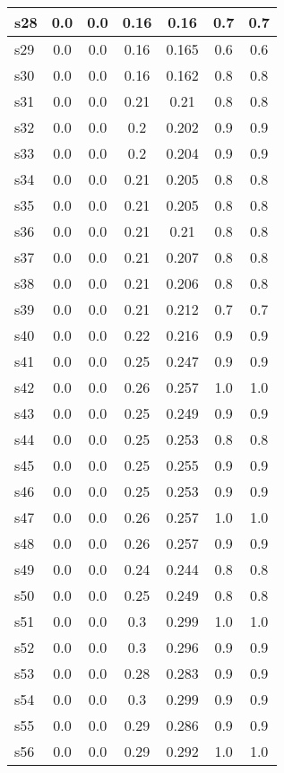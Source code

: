 \documentclass{article}
\begin{document}
\begin{tabular}{|l|c|c|c|c|c|c|}
\hline
s28 &0.0 & 0.0 & 0.16 & 0.16 & 0.7 & 0.7\\
\hline
s29 &0.0 & 0.0 & 0.16 & 0.165 & 0.6 & 0.6\\
\hline
s30 &0.0 & 0.0 & 0.16 & 0.162 & 0.8 & 0.8\\
\hline
s31 &0.0 & 0.0 & 0.21 & 0.21 & 0.8 & 0.8\\
\hline
s32 &0.0 & 0.0 & 0.2 & 0.202 & 0.9 & 0.9\\
\hline
s33 &0.0 & 0.0 & 0.2 & 0.204 & 0.9 & 0.9\\
\hline
s34 &0.0 & 0.0 & 0.21 & 0.205 & 0.8 & 0.8\\
\hline
s35 &0.0 & 0.0 & 0.21 & 0.205 & 0.8 & 0.8\\
\hline
s36 &0.0 & 0.0 & 0.21 & 0.21 & 0.8 & 0.8\\
\hline
s37 &0.0 & 0.0 & 0.21 & 0.207 & 0.8 & 0.8\\
\hline
s38 &0.0 & 0.0 & 0.21 & 0.206 & 0.8 & 0.8\\
\hline
s39 &0.0 & 0.0 & 0.21 & 0.212 & 0.7 & 0.7\\
\hline
s40 &0.0 & 0.0 & 0.22 & 0.216 & 0.9 & 0.9\\
\hline
s41 &0.0 & 0.0 & 0.25 & 0.247 & 0.9 & 0.9\\
\hline
s42 &0.0 & 0.0 & 0.26 & 0.257 & 1.0 & 1.0\\
\hline
s43 &0.0 & 0.0 & 0.25 & 0.249 & 0.9 & 0.9\\
\hline
s44 &0.0 & 0.0 & 0.25 & 0.253 & 0.8 & 0.8\\
\hline
s45 &0.0 & 0.0 & 0.25 & 0.255 & 0.9 & 0.9\\
\hline
s46 &0.0 & 0.0 & 0.25 & 0.253 & 0.9 & 0.9\\
\hline
s47 &0.0 & 0.0 & 0.26 & 0.257 & 1.0 & 1.0\\
\hline
s48 &0.0 & 0.0 & 0.26 & 0.257 & 0.9 & 0.9\\
\hline
s49 &0.0 & 0.0 & 0.24 & 0.244 & 0.8 & 0.8\\
\hline
s50 &0.0 & 0.0 & 0.25 & 0.249 & 0.8 & 0.8\\
\hline
s51 &0.0 & 0.0 & 0.3 & 0.299 & 1.0 & 1.0\\
\hline
s52 &0.0 & 0.0 & 0.3 & 0.296 & 0.9 & 0.9\\
\hline
s53 &0.0 & 0.0 & 0.28 & 0.283 & 0.9 & 0.9\\
\hline
s54 &0.0 & 0.0 & 0.3 & 0.299 & 0.9 & 0.9\\
\hline
s55 &0.0 & 0.0 & 0.29 & 0.286 & 0.9 & 0.9\\
\hline
s56 &0.0 & 0.0 & 0.29 & 0.292 & 1.0 & 1.0\\

\end{tabular}
\end{document}
